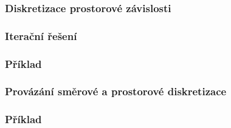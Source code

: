 \begin{frame}
  \frametitle{Diskretizace prostorové závislosti}
  


\end{frame}

\begin{frame}
  \frametitle{Iterační řešení}
  


\end{frame}

\begin{frame}
  \frametitle{Příklad}
  


\end{frame}

\begin{frame}
  \frametitle{Provázání směrové a prostorové diskretizace}
  


\end{frame}

\begin{frame}
  \frametitle{Příklad}
  


\end{frame}
